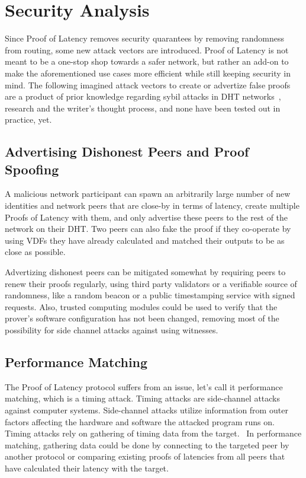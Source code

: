 \section{Security Analysis}
Since Proof of Latency removes security quarantees by removing randomness from routing, some new attack vectors are introduced. Proof of Latency is not meant to be a one-stop shop towards a safer network, but rather an add-on to make the aforementioned use cases more efficient while still keeping security in mind. The following imagined attack vectors to create or advertize false proofs are a product of prior knowledge regarding sybil attacks in DHT networks~\cite{Urdaneta2011-oi, Al-Ameen2014-gc, Cholez2009-po, Yu2008-xl}, research and the writer's thought process, and none have been tested out in practice, yet.

\subsection{Advertising Dishonest Peers and Proof Spoofing}
A malicious network participant can spawn an arbitrarily large number of new identities and network peers that are close-by in terms of latency, create multiple Proofs of Latency with them, and only advertise these peers to the rest of the network on their DHT. Two peers can also fake the proof if they co-operate by using VDFs they have already calculated and matched their outputs to be as close as possible.

Advertizing dishonest peers can be mitigated somewhat by requiring peers to renew their proofs regularly, using third party validators or a verifiable source of randomness, like a random beacon or a public timestamping service with signed requests. Also, trusted computing modules could be used to verify that the prover's software configuration has not been changed, removing most of the possibility for side channel attacks against using witnesses.

\subsection{Performance Matching}
The Proof of Latency protocol suffers from an issue, let's call it performance matching, which is a timing attack. Timing attacks are side-channel attacks against computer systems. Side-channel attacks utilize information from outer factors affecting the hardware and software the attacked program runs on. Timing attacks rely on gathering of timing data from the target.~\cite{noauthor_undated-mp} In performance matching, gathering data could be done by connecting to the targeted peer by another protocol or comparing existing proofs of latencies from all peers that have calculated their latency with the target.

